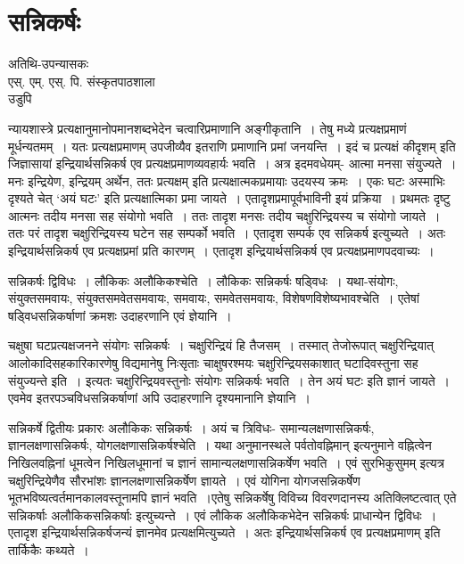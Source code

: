{\fontsize{15}{17}\selectfont
\presetvalues
\chapter{सन्निकर्षः}

\begin{center}
\smallskip
अतिथि-उपन्यासकः\\
एस्. एम्. एस्. पि. संस्कृतपाठशाला\\
उडुपि
\addrule
\end{center} 
न्यायशास्त्रे प्रत्यक्षानुमानोपमानशब्दभेदेन चत्वारिप्रमाणानि अङ्गीकृतानि~। तेषु मध्ये प्रत्यक्ष\-प्रमाणं मूर्धन्यतमम्~। यतः प्रत्यक्षप्रमाणम् उपजीव्यैव इतराणि प्रमाणानि प्रमां जनयन्ति~। इदं च प्रत्यक्षं कीदृशम् इति जिज्ञासायां इन्द्रियार्थसन्निकर्ष एव प्रत्यक्षप्रमाणव्यवहार्यः भवति~। अत्र इदमवधेयम्- आत्मा मनसा संयुज्यते~। मनः इन्द्रियेण, इन्द्रियम् अर्थेन, ततः प्रत्यक्षम् इति प्रत्यक्षात्मकप्रमायाः उदयस्य क्रमः~। एकः घटः अस्माभिः दृश्यते चेत् ‘अयं घटः’ इति प्रत्यक्षात्मिका प्रमा जायते~। एतादृशप्रमापूर्वभाविनी इयं प्रक्रिया~। प्रथमतः दृष्टु आत्मनः तदीय मनसा सह संयोगो भवति~। ततः तादृश मनसः तदीय चक्षुरिन्द्रियस्य च संयोगो जायते~। ततः परं तादृश चक्षुरिन्द्रियस्य घटेन सह सम्पर्को भवति~। एतादृश सम्पर्क एव सन्निकर्ष इत्युच्यते~। अतः इन्द्रियार्थसन्निकर्ष एव प्रत्यक्षप्रमां प्रति कारणम्~। एतादृश इन्द्रियार्थसन्निकर्ष एव प्रत्यक्षप्रमाणपदवाच्यः~। 
\vskip 4pt

सन्निकर्षः द्विविधः~। लौकिकः अलौकिकश्चेति~। लौकिकः सन्निकर्षः षड्विधः~। यथा-संयोगः, संयुक्तसमवायः, संयुक्तसमवेतसमवायः, समवायः, समवेतसमवायः, विशेषण\-विशेष्यभावश्चेति~। एतेषां षड्विधसन्निकर्षाणां क्रमशः उदाहरणानि एवं ज्ञेयानि~। 
\vskip 4pt

चक्षुषा घटप्रत्यक्षजनने संयोगः सन्निकर्षः~। चक्षुरिन्द्रियं हि तैजसम्~। तस्मात् तेजोरूपात् चक्षुरिन्द्रियात् आलोकादिसहकारिकारणेषु विद्यमानेषु निःसृताः चाक्षुषरश्मयः चक्षुरिन्द्रियसकाशात् घटादिवस्तुना सह संयुज्यन्ते इति~। इत्यतः चक्षुरिन्द्रियवस्तुनोः संयोगः सन्निकर्षः भवति~। तेन अयं घटः इति ज्ञानं जायते~। एवमेव इतरपञ्चविधसन्निकर्षाणां अपि उदाहरणानि दृश्यमानानि ज्ञेयानि~।            

सन्निकर्षे द्वितीयः प्रकारः अलौकिकः सन्निकर्षः~। अयं च त्रिविधः- समान्यलक्षणा\-सन्निकर्षः, ज्ञानलक्षणासन्निकर्षः, योगलक्षणासन्निकर्षश्चेति~। यथा अनुमानस्थले पर्वतो\break वह्निमान् इत्यनुमाने वह्नित्वेन निखिलवह्निनां धूमत्वेन निखिलधूमानां च ज्ञानं सामान्यलक्षणासन्निकर्षेण भवति~। एवं सुरभिकुसुमम् इत्यत्र चक्षुरिन्द्रियेणैव सौरभांशः ज्ञानलक्षणासन्निकर्षेण ज्ञायते~। एवं योगिना योगजसन्निकर्षेण भूतभविष्यत्वर्तमानकालवस्तूनामपि ज्ञानं भवति~।\break एतेषु सन्निकर्षेषु विविच्य विवरणदानस्य अतिक्लिष्टत्वात् एते सन्निकर्षाः अलौकिकसन्निकर्षाः इत्युच्यन्ते~। एवं लौकिक अलौकिकभेदेन सन्निकर्षः प्राधान्येन द्विविधः~। एतादृश इन्द्रियार्थसन्निकर्षजन्यं ज्ञानमेव प्रत्यक्षमित्युच्यते~। अतः  इन्द्रियार्थसन्निकर्ष एव प्रत्यक्षप्रमाणम् इति तार्किकैः कथ्यते~। 

\articleend
}
